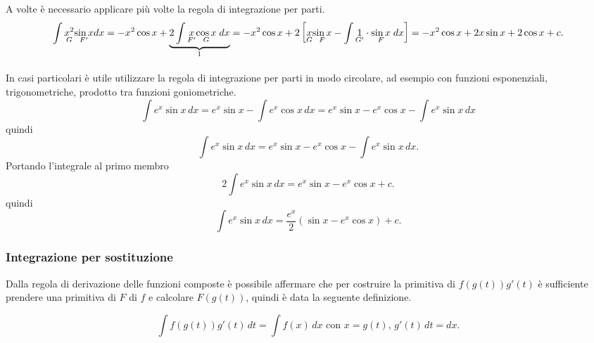 \begin{example}
    A volte è necessario applicare più volte la regola di integrazione per parti.
    \begin{equation*}
        \int \underset{G}{x^2}\underset{F'}{\sin x}dx=-x^2\cos x+\underbrace{2\int\underset{F'}{x}\underset{G}{\cos x} \; dx}_{\footnotemark}=-x^2\cos x + 2 \left[\underset{G}{x}\underset{F}{\sin x} - \int \underset{G'}{1}\cdot\underset{F}{\sin x} \; dx \right]=-x^2\cos x+ 2x\sin x + 2\cos x + c.
    \end{equation*}
\end{example}

\begin{example}
    In casi particolari è utile utilizzare la regola di integrazione per parti in modo circolare, ad esempio con funzioni esponenziali, trigonometriche, prodotto tra funzioni goniometriche.
    \begin{equation*}
        \int e^x\sin x\, dx= e^x\sin x - \int e^x \cos x\, dx= e^x\sin x - e^x\cos x - \int e^x \sin x\, dx
    \end{equation*}
    quindi
    \begin{equation*}
        \int e^x\sin x\, dx= e^x\sin x - e^x\cos x - \int e^x \sin x\, dx.
    \end{equation*}
    Portando l'integrale al primo membro
    \begin{equation*}
        2\int e^x\sin x\, dx= e^x\sin x - e^x\cos x + c.
    \end{equation*}
    quindi
    \begin{equation*}
        \int e^x\sin x\, dx= \frac{e^x}{2}(\sin x - e^x\cos x) + c.
    \end{equation*}
\end{example}

\subsubsection{Integrazione per sostituzione}
Dalla regola di derivazione delle funzioni composte è possibile affermare che per costruire la primitiva di $f(g(t))g'(t)$ è sufficiente prendere una primitiva di $F$ di $f$ e calcolare $F(g(t))$, quindi è data la seguente definizione.
\begin{definition}
    \begin{equation*}
        \int f(g(t))g'(t)\, dt= \int f(x)\, dx \text{ con } x=g(t),\, g'(t)\, dt=dx.
    \end{equation*}
\end{definition}

